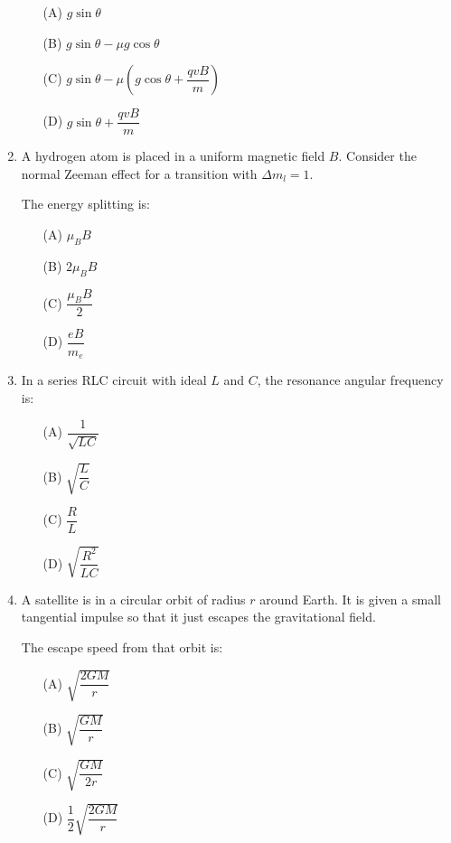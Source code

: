\documentclass[12pt]{article}
\begin{document}
\begin{enumerate}[leftmargin=0pt,itemindent=0pt]
\begin{enumerate}
\item[(A)] $g\sin\theta$
\item[(B)] $g\sin\theta-\mu g\cos\theta$
\item[(C)] $g\sin\theta-\mu\left(g\cos\theta+\dfrac{qvB}{m}\right)$
\item[(D)] $g\sin\theta+\dfrac{qvB}{m}$
\end{enumerate}


\item A hydrogen atom is placed in a uniform magnetic field $B$. Consider the normal Zeeman effect for a transition with $\Delta m_l = 1$.

The energy splitting is:

\begin{enumerate}
\item[(A)] $\mu_B B$
\item[(B)] $2\mu_B B$
\item[(C)] $\dfrac{\mu_B B}{2}$
\item[(D)] $\dfrac{eB}{m_e}$
\end{enumerate}


\item In a series RLC circuit with ideal $L$ and $C$, the resonance angular frequency is:

\begin{enumerate}
\item[(A)] $\dfrac{1}{\sqrt{LC}}$
\item[(B)] $\sqrt{\dfrac{L}{C}}$
\item[(C)] $\dfrac{R}{L}$
\item[(D)] $\sqrt{\dfrac{R^2}{LC}}$
\end{enumerate}


\item A satellite is in a circular orbit of radius $r$ around Earth. It is given a small tangential impulse so that it just escapes the gravitational field.

The escape speed from that orbit is:

\begin{enumerate}
\item[(A)] $\sqrt{\dfrac{2GM}{r}}$
\item[(B)] $\sqrt{\dfrac{GM}{r}}$
\item[(C)] $\sqrt{\dfrac{GM}{2r}}$
\item[(D)] $\dfrac{1}{2}\sqrt{\dfrac{2GM}{r}}$
\end{enumerate}


\end{enumerate}
\end{document}

